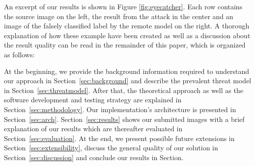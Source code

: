 An excerpt of our results is shown in Figure \ref{fig:eyecatcher}. 
Each row contains the source image on the left, the result from the attack in the center and an image of the falsely classified label by the remote model on the right.
A thorough explanation of how these example have been created as well as a discussion about the result quality can be read in the remainder of this paper, which is organized as follows:

At the beginning, we provide the background information required to understand our approach in Section~\ref{sec:background} and describe the prevalent threat model in Section~\ref{sec:threatmodel}.
After that, the theoretical approach as well as the software development and testing strategy are explained in Section~\ref{sec:methodology}.
Our implementation's architecture is presented in Section~\ref{sec:arch}.
Section~\ref{sec:results} shows our submitted images with a brief explanation of our results which are thereafter evaluated in Section~\ref{sec:evaluation}.
At the end, we present possible future extensions in Section~\ref{sec:extensibility}, discuss the general quality of our solution in Section~\ref{sec:discussion} and conclude our results in Section.